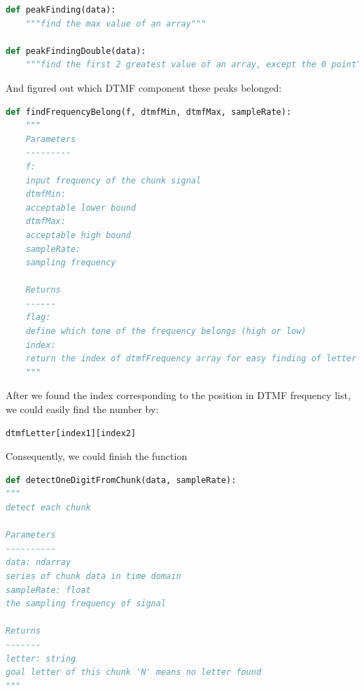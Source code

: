 \documentclass[a4paper,12pt]{article}
\begin{document}
\begin{lstlisting}[language=Python]
def peakFinding(data):
	"""find the max value of an array"""

def peakFindingDouble(data):
	"""find the first 2 greatest value of an array, except the 0 point"""
\end{lstlisting}
And figured out which DTMF component these peaks belonged:
\begin{lstlisting}[language=Python]
def findFrequencyBelong(f, dtmfMin, dtmfMax, sampleRate):
	"""
	Parameters
	---------
	f: 
	input frequency of the chunk signal
	dtmfMin: 
	acceptable lower bound 
	dtmfMax: 
	acceptable high bound
	sampleRate: 
	sampling frequency
	
	Returns
	------
	flag: 
	define which tone of the frequency belongs (high or low) 
	index: 
	return the index of dtmfFrequency array for easy finding of letter
	"""
\end{lstlisting}
After we found the index corresponding to the position in DTMF frequency list, we could easily find the number by:
\begin{lstlisting}[language=Python]
dtmfLetter[index1][index2]
\end{lstlisting}
Consequently, we could finish the function
\begin{lstlisting}[language=Python]
def detectOneDigitFromChunk(data, sampleRate):
"""
detect each chunk

Parameters
----------
data: ndarray
series of chunk data in time domain
sampleRate: float
the sampling frequency of signal

Returns
-------
letter: string
goal letter of this chunk 'N' means no letter found
"""
\end{lstlisting}
\end{document}
